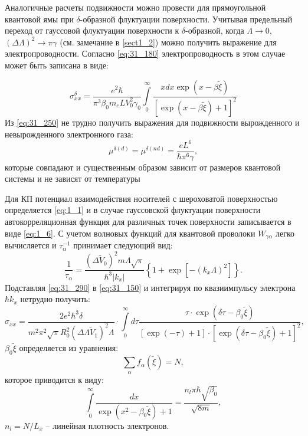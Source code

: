 Аналогичные расчеты подвижности можно провести для прямоугольной квантовой ямы при $\delta$-образной флуктуации поверхности. Учитывая предельный переход от гауссовой флуктуации поверхности к $\delta $-образной, когда $\Lambda \to 0$, ${\left(\Delta \Lambda \right)}^2\to \pi \gamma $ (см. замечание в \ref{sect1_2}) можно получить выражение для электропроводности. Согласно \eqref{eq:31_180} электропроводность в этом случае может быть записана в виде:

\begin{equation} \label{eq:31_250}
{\sigma }^{\delta }_{xx}=\frac{e^2\hbar }{{\pi }^3{\beta }_0 m_e L V^2_0 \gamma_0 }\int\limits_0^\infty{\frac{x dx \exp{(x-\beta \widetilde{\xi })}}{{\left[ \exp{(x-\beta \widetilde{\xi })}+1 \right] }^2}}
\end{equation}
Из \eqref{eq:31_250} не трудно получить выражения для подвижности вырожденного и невырожденного электронного газа: 
\begin{equation} \label{eq:31_260}
\mu^{\delta \left(d\right)} = \mu^{\delta \left(n d\right)}=\frac{e L^6}{\hbar {\pi }^6\gamma },
\end{equation}
которые совпадают и существенным образом зависит от размеров квантовой системы и не зависят от температуры

Для КП потенциал взаимодействия носителей с шероховатой поверхностью определяется \eqref{eq:1_1} и в случае гауссовской флуктуации поверхности автокорреляционная функция для различных точек поверхности записывается в виде \eqref{eq:1_6}. С учетом волновых функций для квантовой проволоки \cite{Constantinou1989} $W_{\gamma \alpha } $ легко вычисляется и $\tau_{\alpha }^{-1} $ принимает следующий вид:
\begin{equation} \label{eq:31_290}
\frac{1}{\tau _{\alpha } } =\frac{(\Delta \tilde{V}_0 )^2 m\Lambda \sqrt{\pi } }{\hbar^3 \left|k_x \right|} \left\{1+ \exp\left[-\left(k_x \Lambda \right)^2 \right]\right\}.
\end{equation}
Подставляя \eqref{eq:31_290} в \eqref{eq:31_150} и интегрируя по квазиимпульсу электрона $\hbar k_x $ нетрудно получить:
\begin{equation} \label{eq:31_300}
\sigma_{xx} =\frac{2 e^2 \hbar^3 \delta }{m^2 \pi^2 \sqrt{\pi } R_0^2 (\Delta \Lambda \tilde{V}_1 )^2 \Lambda } \cdot \int \limits_0^{\infty }{d\tau \frac{\tau \cdot \exp(\delta \tau -\beta_0 \tilde{\xi })}{\left[ \exp(-\tau )+1\right] \cdot \left[ \exp(\delta \tau -\beta_0 \tilde{\xi })+1\right]^2 }},
\end{equation}
$\beta_0 \tilde{\xi }$ определяется из уравнения:
\[
\sum_{\alpha } {f_{\alpha}(\tilde{\xi }) = N},
\]
которое приводится к виду:
\begin{equation} \label{eq:31_305}
\int\limits_0^{\infty }{\frac{dx}{\exp \left(x^{2} -\beta _{0} \tilde{\xi }\right)+1}} =\frac{n_{l} \pi \hbar \sqrt{\beta _{0} } }{\sqrt{8m} },
\end{equation}
$n_{l} =N/L_{x} $ -- линейная плотность электронов.

